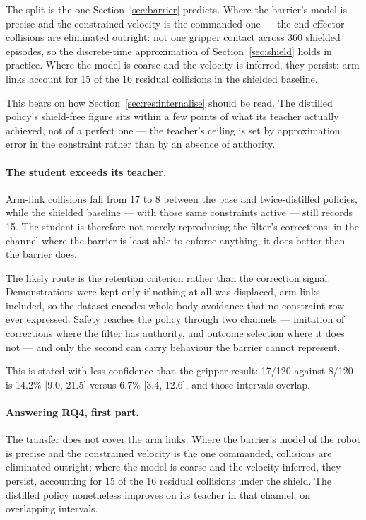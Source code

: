The split is the one Section~\ref{sec:barrier} predicts. Where the barrier's model is precise and
the constrained velocity is the commanded one --- the end-effector --- collisions are eliminated
outright: not one gripper contact across 360 shielded episodes, so the discrete-time
approximation of Section~\ref{sec:shield} holds in practice. Where the model is coarse and the
velocity is inferred, they persist: arm links account for 15 of the 16 residual collisions in the
shielded baseline.

This bears on how Section~\ref{sec:res:internalise} should be read. The distilled policy's
shield-free figure sits within a few points of what its teacher actually achieved, not of a
perfect one --- the teacher's ceiling is set by approximation error in the constraint rather than
by an absence of authority.

\paragraph{The student exceeds its teacher.}
Arm-link collisions fall from 17 to 8 between the base and twice-distilled policies, while the
shielded baseline --- with those same constraints active --- still records 15. The student is
therefore not merely reproducing the filter's corrections: in the channel where the barrier is
least able to enforce anything, it does better than the barrier does.

The likely route is the retention criterion rather than the correction signal. Demonstrations
were kept only if nothing at all was displaced, arm links included, so the dataset encodes
whole-body avoidance that no constraint row ever expressed. Safety reaches the policy through
two channels --- imitation of corrections where the filter has authority, and outcome selection
where it does not --- and only the second can carry behaviour the barrier cannot represent.

This is stated with less confidence than the gripper result: 17/120 against 8/120 is
14.2\% [9.0, 21.5] versus 6.7\% [3.4, 12.6], and those intervals overlap.


\paragraph{Answering RQ4, first part.}
The transfer does not cover the arm links. Where the barrier's model of the robot is precise and
the constrained velocity is the one commanded, collisions are eliminated outright; where the model
is coarse and the velocity inferred, they persist, accounting for 15 of the 16 residual collisions
under the shield. The distilled policy nonetheless improves on its teacher in that channel, on
overlapping intervals.

